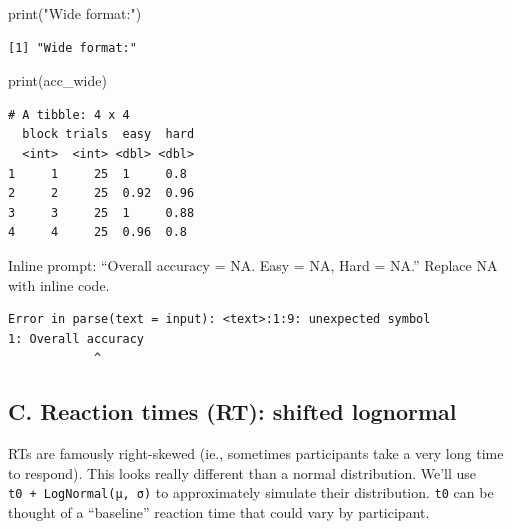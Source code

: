 \documentclass[
  letterpaper,
  DIV=11,
  numbers=noendperiod]{scrartcl}
\newenvironment{Shaded}{\begin{snugshade}}{\end{snugshade}}
\newcommand{\FunctionTok}[1]{\textcolor[rgb]{0.28,0.35,0.67}{#1}}
\newcommand{\NormalTok}[1]{\textcolor[rgb]{0.00,0.23,0.31}{#1}}
\newcommand{\OtherTok}[1]{\textcolor[rgb]{0.00,0.23,0.31}{#1}}
\newcommand{\StringTok}[1]{\textcolor[rgb]{0.13,0.47,0.30}{#1}}
\begin{document}
\begin{Shaded}
\begin{Highlighting}[]
\FunctionTok{print}\NormalTok{(}\StringTok{"Wide format:"}\NormalTok{)}
\end{Highlighting}
\end{Shaded}

\begin{verbatim}
[1] "Wide format:"
\end{verbatim}

\begin{Shaded}
\begin{Highlighting}[]
\FunctionTok{print}\NormalTok{(acc\_wide)}
\end{Highlighting}
\end{Shaded}

\begin{verbatim}
# A tibble: 4 x 4
  block trials  easy  hard
  <int>  <int> <dbl> <dbl>
1     1     25  1     0.8 
2     2     25  0.92  0.96
3     3     25  1     0.88
4     4     25  0.96  0.8 
\end{verbatim}

Inline prompt: ``Overall accuracy = NA. Easy = NA, Hard = NA.'' Replace
NA with inline code.

\begin{Shaded}
\end{Shaded}

\begin{verbatim}
Error in parse(text = input): <text>:1:9: unexpected symbol
1: Overall accuracy
            ^
\end{verbatim}

\subsection{C. Reaction times (RT): shifted
lognormal}\label{c.-reaction-times-rt-shifted-lognormal}

RTs are famously right-skewed (ie., sometimes participants take a very
long time to respond). This looks really different than a normal
distribution. We'll use \texttt{t0\ +\ LogNormal(μ,\ σ)} to
approximately simulate their distribution. \texttt{t0} can be thought of
a ``baseline'' reaction time that could vary by participant.
\end{document}
